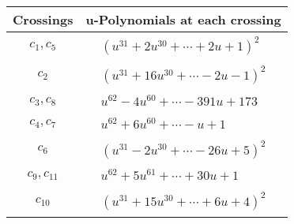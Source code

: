 \documentclass[1p]{elsarticle_modified}
\theoremstyle{definition}
\begin{document}
\begin{tabular}{m{50pt}|m{274pt}}
Crossings & \hspace{64pt}u-Polynomials at each crossing \\
\hline $$\begin{aligned}c_{1},c_{5}\end{aligned}$$&$\begin{aligned}
&(u^{31}+2 u^{30}+\cdots+2 u+1)^{2}
\end{aligned}$\\
\hline $$\begin{aligned}c_{2}\end{aligned}$$&$\begin{aligned}
&(u^{31}+16 u^{30}+\cdots-2 u-1)^{2}
\end{aligned}$\\
\hline $$\begin{aligned}c_{3},c_{8}\end{aligned}$$&$\begin{aligned}
&u^{62}-4 u^{60}+\cdots-391 u+173
\end{aligned}$\\
\hline $$\begin{aligned}c_{4},c_{7}\end{aligned}$$&$\begin{aligned}
&u^{62}+6 u^{60}+\cdots- u+1
\end{aligned}$\\
\hline $$\begin{aligned}c_{6}\end{aligned}$$&$\begin{aligned}
&(u^{31}-2 u^{30}+\cdots-26 u+5)^{2}
\end{aligned}$\\
\hline $$\begin{aligned}c_{9},c_{11}\end{aligned}$$&$\begin{aligned}
&u^{62}+5 u^{61}+\cdots+30 u+1
\end{aligned}$\\
\hline $$\begin{aligned}c_{10}\end{aligned}$$&$\begin{aligned}
&(u^{31}+15 u^{30}+\cdots+6 u+4)^{2}
\end{aligned}$\\
\hline
\end{tabular}\\~\\
\newpage\renewcommand{\arraystretch}{1}
\end{document}
